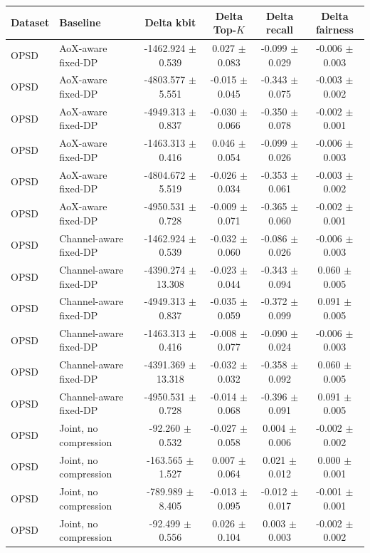 \begin{tabular}{llcccc}
\toprule
Dataset & Baseline & Delta kbit & Delta Top-$K$ & Delta recall & Delta fairness \\
\midrule
OPSD & AoX-aware fixed-DP & -1462.924 $\pm$ 0.539 & 0.027 $\pm$ 0.083 & -0.099 $\pm$ 0.029 & -0.006 $\pm$ 0.003 \\
OPSD & AoX-aware fixed-DP & -4803.577 $\pm$ 5.551 & -0.015 $\pm$ 0.045 & -0.343 $\pm$ 0.075 & -0.003 $\pm$ 0.002 \\
OPSD & AoX-aware fixed-DP & -4949.313 $\pm$ 0.837 & -0.030 $\pm$ 0.066 & -0.350 $\pm$ 0.078 & -0.002 $\pm$ 0.001 \\
OPSD & AoX-aware fixed-DP & -1463.313 $\pm$ 0.416 & 0.046 $\pm$ 0.054 & -0.099 $\pm$ 0.026 & -0.006 $\pm$ 0.003 \\
OPSD & AoX-aware fixed-DP & -4804.672 $\pm$ 5.519 & -0.026 $\pm$ 0.034 & -0.353 $\pm$ 0.061 & -0.003 $\pm$ 0.002 \\
OPSD & AoX-aware fixed-DP & -4950.531 $\pm$ 0.728 & -0.009 $\pm$ 0.071 & -0.365 $\pm$ 0.060 & -0.002 $\pm$ 0.001 \\
OPSD & Channel-aware fixed-DP & -1462.924 $\pm$ 0.539 & -0.032 $\pm$ 0.060 & -0.086 $\pm$ 0.026 & -0.006 $\pm$ 0.003 \\
OPSD & Channel-aware fixed-DP & -4390.274 $\pm$ 13.308 & -0.023 $\pm$ 0.044 & -0.343 $\pm$ 0.094 & 0.060 $\pm$ 0.005 \\
OPSD & Channel-aware fixed-DP & -4949.313 $\pm$ 0.837 & -0.035 $\pm$ 0.059 & -0.372 $\pm$ 0.099 & 0.091 $\pm$ 0.005 \\
OPSD & Channel-aware fixed-DP & -1463.313 $\pm$ 0.416 & -0.008 $\pm$ 0.077 & -0.090 $\pm$ 0.024 & -0.006 $\pm$ 0.003 \\
OPSD & Channel-aware fixed-DP & -4391.369 $\pm$ 13.318 & -0.032 $\pm$ 0.032 & -0.358 $\pm$ 0.092 & 0.060 $\pm$ 0.005 \\
OPSD & Channel-aware fixed-DP & -4950.531 $\pm$ 0.728 & -0.014 $\pm$ 0.068 & -0.396 $\pm$ 0.091 & 0.091 $\pm$ 0.005 \\
OPSD & Joint, no compression & -92.260 $\pm$ 0.532 & -0.027 $\pm$ 0.058 & 0.004 $\pm$ 0.006 & -0.002 $\pm$ 0.002 \\
OPSD & Joint, no compression & -163.565 $\pm$ 1.527 & 0.007 $\pm$ 0.064 & 0.021 $\pm$ 0.012 & 0.000 $\pm$ 0.001 \\
OPSD & Joint, no compression & -789.989 $\pm$ 8.405 & -0.013 $\pm$ 0.095 & -0.012 $\pm$ 0.017 & -0.001 $\pm$ 0.001 \\
OPSD & Joint, no compression & -92.499 $\pm$ 0.556 & 0.026 $\pm$ 0.104 & 0.003 $\pm$ 0.003 & -0.002 $\pm$ 0.002 \\

\end{tabular}
